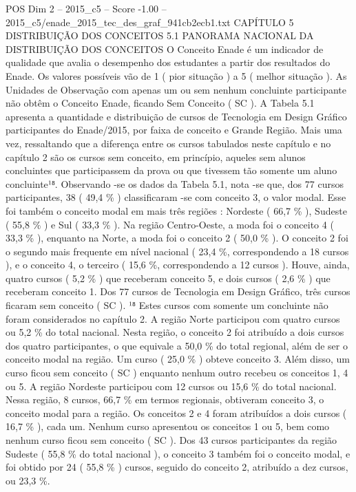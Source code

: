 \begin{textsample}{POS Dim 2 – 2015\_c5 – Score -1.00 – 2015\_c5/enade\_2015\_tec\_des\_graf\_941cb2ecb1.txt}  \label{ex:f2_pos_282}
CAPÍTULO 5 DISTRIBUIÇÃO DOS CONCEITOS 5.1 PANORAMA NACIONAL DA DISTRIBUIÇÃO DOS CONCEITOS O Conceito Enade é um indicador de qualidade que avalia o desempenho dos estudantes a partir dos resultados do Enade.
Os valores possíveis vão de 1 ( pior situação ) a 5 ( melhor situação ).
As Unidades de Observação com apenas um ou sem nenhum concluinte participante não obtêm o Conceito Enade, ficando Sem Conceito ( SC ).
A Tabela 5.1 apresenta a quantidade e distribuição de cursos de Tecnologia em Design Gráfico participantes do Enade/2015, por faixa de conceito e Grande Região.
Mais uma vez, ressaltando que a diferença entre os cursos tabulados neste capítulo e no capítulo 2 são os cursos sem conceito, em princípio, aqueles sem alunos concluintes que participassem da prova ou que tivessem tão somente um aluno concluinte¹⁸.
Observando -se os dados da Tabela 5.1, nota -se que, dos 77 cursos participantes, 38 ( 49,4 \% ) classificaram -se com conceito 3, o valor modal.
Esse foi também o conceito modal em mais três regiões : Nordeste ( 66,7 \% ), Sudeste ( 55,8 \% ) e Sul ( 33,3 \% ).
Na região Centro-Oeste, a moda foi o conceito 4 ( 33,3 \% ), enquanto na Norte, a moda foi o conceito 2 ( 50,0 \% ).
O conceito 2 foi o segundo mais frequente em nível nacional ( 23,4 \%, correspondendo a 18 cursos ), e o conceito 4, o terceiro ( 15,6 \%, correspondendo a 12 cursos ).
Houve, ainda, quatro cursos ( 5,2 \% ) que receberam conceito 5, e dois cursos ( 2,6 \% ) que receberam conceito 1.
Dos 77 cursos de Tecnologia em Design Gráfico, três cursos ficaram sem conceito ( SC ). ¹⁸ Estes cursos com somente um concluinte não foram considerados no capítulo 2.
A região Norte participou com quatro cursos ou 5,2 \% do total nacional.
Nesta região, o conceito 2 foi atribuído a dois cursos dos quatro participantes, o que equivale a 50,0 \% do total regional, além de ser o conceito modal na região.
Um curso ( 25,0 \% ) obteve conceito 3.
Além disso, um curso ficou sem conceito ( SC ) enquanto nenhum outro recebeu os conceitos 1, 4 ou 5.
A região Nordeste participou com 12 cursos ou 15,6 \% do total nacional.
Nessa região, 8 cursos, 66,7 \% em termos regionais, obtiveram conceito 3, o conceito modal para a região.
Os conceitos 2 e 4 foram atribuídos a dois cursos ( 16,7 \% ), cada um.
Nenhum curso apresentou os conceitos 1 ou 5, bem como nenhum curso ficou sem conceito ( SC ).
Dos 43 cursos participantes da região Sudeste ( 55,8 \% do total nacional ), o conceito 3 também foi o conceito modal, e foi obtido por 24 ( 55,8 \% ) cursos, seguido do conceito 2, atribuído a dez cursos, ou 23,3 \%.

\end{textsample}
